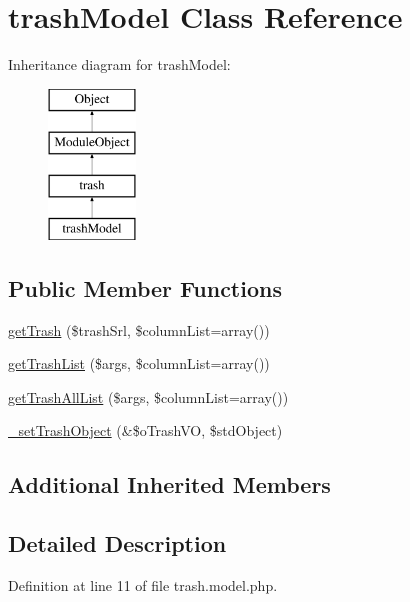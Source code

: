 \hypertarget{classtrashModel}{\section{trash\+Model Class Reference}
\label{classtrashModel}
}
Inheritance diagram for trash\+Model\+:\begin{figure}[H]
\begin{center}
\leavevmode
\includegraphics[height=4.000000cm]{classtrashModel}
\end{center}
\end{figure}
\subsection*{Public Member Functions}
\begin{DoxyCompactItemize}
\item 
\hyperlink{classtrashModel_ac0f5e5599f150c464bc0d96063ed632f}{get\+Trash} (\$trash\+Srl, \$column\+List=array())
\item 
\hyperlink{classtrashModel_a0b375cfc47cac28e3b7d7fd8555483fc}{get\+Trash\+List} (\$args, \$column\+List=array())
\item 
\hyperlink{classtrashModel_aad709b5f33dfed12c179dd1582b3e507}{get\+Trash\+All\+List} (\$args, \$column\+List=array())
\item 
\hyperlink{classtrashModel_af410c03d8545197837e381ecce862a7c}{\+\_\+set\+Trash\+Object} (\&\$o\+Trash\+V\+O, \$std\+Object)
\end{DoxyCompactItemize}
\subsection*{Additional Inherited Members}


\subsection{Detailed Description}


Definition at line 11 of file trash.\+model.\+php.



